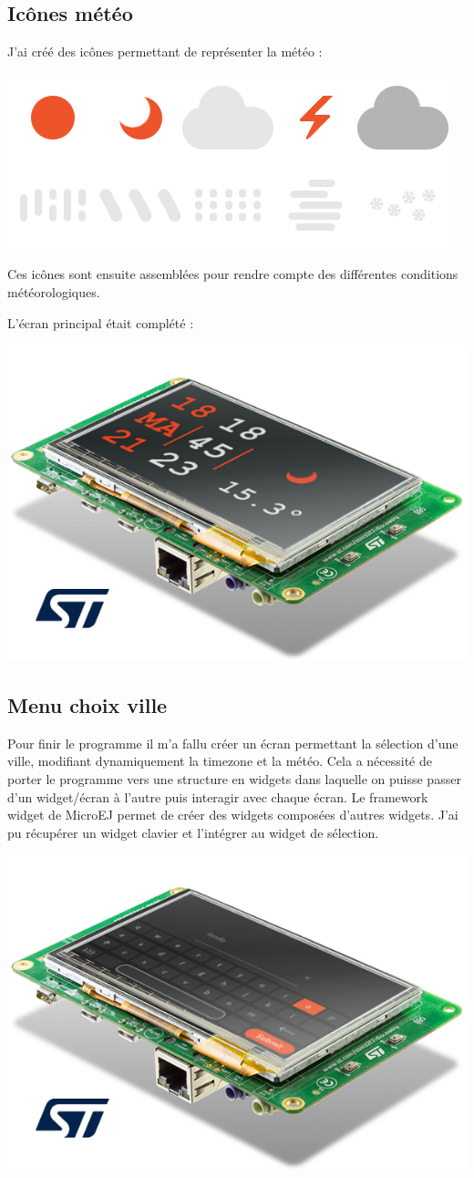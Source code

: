 \documentclass[french,a4paper,12pt]{report}
\begin{document}
\subsection{Icônes météo}

J'ai créé des icônes permettant de représenter la météo :

\begin{center}
\includegraphics[width=.5\textwidth]{./ressources/images/weathertogether.png}
\end{center}

Ces icônes sont ensuite assemblées pour rendre compte des différentes conditions météorologiques.

L'écran principal était complété :

\begin{center}
\includegraphics[width=.5\textwidth]{./ressources/schemas/inSituation.png}
\end{center}

\subsection{Menu choix ville}

Pour finir le programme il m’a fallu créer un écran permettant la sélection d’une ville, modifiant dynamiquement la timezone et la météo. Cela a nécessité de porter le programme vers une structure en widgets dans laquelle on puisse passer d’un widget/écran à l’autre puis interagir avec chaque écran.
Le framework widget de MicroEJ permet de créer des widgets composées d’autres widgets. J'ai pu récupérer un widget clavier et l’intégrer au widget de sélection. 

\begin{center}
\includegraphics[width=.5\textwidth]{./ressources/schemas/inSituationSel.png}
\end{center}
\end{document}
